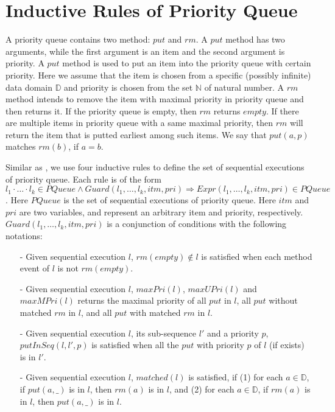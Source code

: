 \section{Inductive Rules of Priority Queue}
\label{sec:inductive rules of priority queue}

A priority queue contains two method: $\textit{put}$ and $\textit{rm}$. A $\textit{put}$ method has two arguments, while the first argument is an item and the second argument is priority. A $\textit{put}$ method is used to put an item into the priority queue with certain priority. Here we assume that the item is chosen from a specific (possibly infinite) data domain $\mathbb{D}$ and priority is chosen from the set $\mathbb{N}$ of natural number. A $\textit{rm}$ method intends to remove the item with maximal priority in priority queue and then returns it. If the priority queue is empty, then $\textit{rm}$ returns $\textit{empty}$. If there are multiple items in priority queue with a same maximal priority, then $\textit{rm}$ will return the item that is putted earliest among such items. We say that $\textit{put}(a,p)$ matches $\textit{rm}(b)$, if $a = b$.

Similar as \cite{Bouajjani:2015}, we use four inductive rules to define the set of sequential executions of priority queue. Each rule is of the form $l_1 \cdot \ldots \cdot l_k \in \textit{PQueue} \wedge \textit{Guard}(l_1,\ldots,l_k,\textit{itm},\textit{pri}) \Rightarrow \textit{Expr}(l_1,\ldots,l_k,\textit{itm},\textit{pri}) \in \textit{PQueue}$. Here $\textit{PQueue}$ is the set of sequential executions of priority queue. Here $\textit{itm}$ and $\textit{pri}$ are two variables, and represent an arbitrary item and priority, respectively. $\textit{Guard}(l_1,\ldots,l_k,\textit{itm},\textit{pri})$ is a conjunction of conditions with the following notations:

\begin{itemize}
\setlength{\itemsep}{0.5pt}
\item[-] Given sequential execution $l$, $\textit{rm}(\textit{empty}) \notin l$ is satisfied when each method event of $l$ is not $\textit{rm}(\textit{empty})$.

\item[-] Given sequential execution $l$, $\textit{maxPri}(l)$, $\textit{maxUPri}(l)$ and $\textit{maxMPri}(l)$ returns the maximal priority of all $\textit{put}$ in $l$, all $\textit{put}$ without matched $\textit{rm}$ in $l$, and all $\textit{put}$ with matched $\textit{rm}$ in $l$.

\item[-] Given sequential execution $l$, its sub-sequence $l'$ and a priority $p$, $\textit{putInSeq}(l,l',p)$ is satisfied when all the $\textit{put}$ with priority $p$ of $l$ (if exists) is in $l'$.

\item[-] Given sequential execution $l$, $\textit{matched}(l)$ is satisfied, if (1) for each $a \in \mathbb{D}$, if $\textit{put}(a,\_)$ is in $l$, then $\textit{rm}(a)$ is in $l$, and (2) for each $a \in \mathbb{D}$, if $\textit{rm}(a)$ is in $l$, then $\textit{put}(a,\_)$ is in $l$.
\end{itemize}

